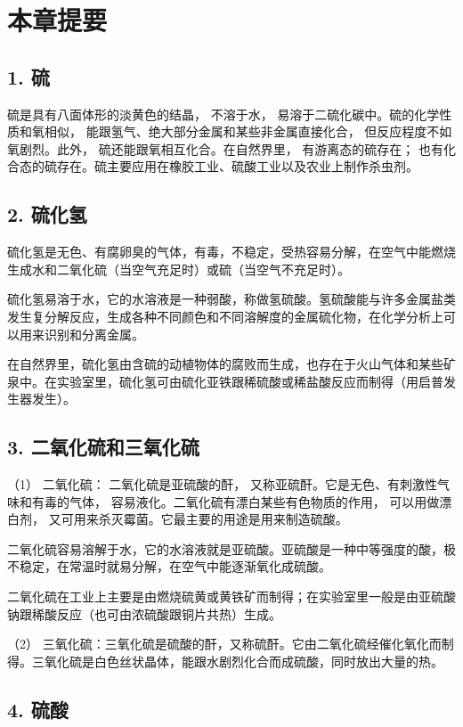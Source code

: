 \section{本章提要}

\subsection{1. 硫}

硫是具有八面体形的淡黄色的结晶， 不溶于水，
易溶于二硫化碳中。硫的化学性质和氧相似，
能跟氢气、绝大部分金属和某些非金属直接化合，
但反应程度不如氧剧烈。此外， 硫还能跟氧相互化合。在自然界里，
有游离态的硫存在；
也有化合态的硫存在。硫主要应用在橡胶工业、硫酸工业以及农业上制作杀虫剂。

\subsection{2. 硫化氢}

硫化氢是无色、有腐卵臭的气体，有毒，不稳定，受热容易分解，在空气中能燃烧生成水和二氧化硫（当空气充足时）或硫（当空气不充足时）。

硫化氢易溶于水，它的水溶液是一种弱酸，称做氢硫酸。氢硫酸能与许多金属盐类发生复分解反应，生成各种不同颜色和不同溶解度的金属硫化物，在化学分析上可以用来识别和分离金属。

在自然界里，硫化氢由含硫的动植物体的腐败而生成，也存在于火山气体和某些矿泉中。在实验室里，硫化氢可由硫化亚铁跟稀硫酸或稀盐酸反应而制得（用启普发生器发生）。

\subsection{3. 二氧化硫和三氧化硫}

（1） 二氧化硫： 二氧化硫是亚硫酸的酐，
又称亚硫酐。它是无色、有刺激性气味和有毒的气体，
容易液化。二氧化硫有漂白某些有色物质的作用， 可以用做漂白剂，
又可用来杀灭霉菌。它最主要的用途是用来制造硫酸。

二氧化硫容易溶解于水，它的水溶液就是亚硫酸。亚硫酸是一种中等强度的酸，极不稳定，在常温时就易分解，在空气中能逐渐氧化成硫酸。

二氧化硫在工业上主要是由燃烧硫黄或黄铁矿而制得；在实验室里一般是由亚硫酸钠跟稀酸反应（也可由浓硫酸跟铜片共热）生成。

（2）
三氧化硫：三氧化硫是硫酸的酐，又称硫酐。它由二氧化硫经催化氧化而制得。三氧化硫是白色丝状晶体，能跟水剧烈化合而成硫酸，同时放出大量的热。

\subsection{4. 硫酸}

